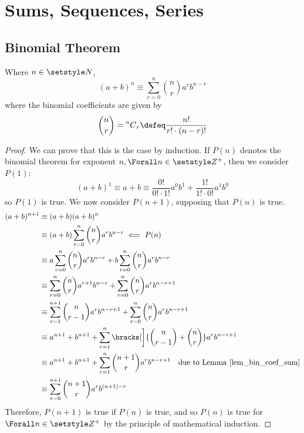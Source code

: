 \section{Sums, Sequences, Series}

\subsection{Binomial Theorem}

\begin{theorem} \label{thm_binomial_thm}
Where \(n \in \Naturals\),
\begin{equation*}
(a + b)^n \equiv \sum_{r = 0}^n \binom nr a^r b^{n - r}
\end{equation*}
where the binomial coefficients are given by
\begin{equation*}
\binom nr = \nCr nr \defeq \frac{n!}{r!\cdot(n - r)!}
\end{equation*}
\end{theorem}
\begin{proof}
We can prove that this is the case by induction. If \(P(n)\) denotes the
binomial theorem for exponent \(n, \Forall n \in \Integers^+\), then we
consider \(P(1)\):
\begin{equation*}
(a + b)^1 \equiv a + b
    \equiv \frac{0!}{0!\cdot 1!} a^0b^1 + \frac{1!}{1!\cdot 0!} a^1b^0
\end{equation*}
so \(P(1)\) is true. We now consider \(P(n + 1)\), supposing that \(P(n)\)
is true.
\begin{align*}
(a + b)^{n + 1} &\equiv (a + b)(a + b)^n \\
    &\equiv (a + b)\sum_{r = 0}^n \binom nr a^r b^{n - r}
        \impliedby P(n) \\
    &\equiv a\sum_{r = 0}^n \binom nr a^r b^{n - r}
          + b\sum_{r = 0}^n \binom nr a^r b^{n - r} \\
    &\equiv \sum_{r = 0}^n \binom nr a^{r + 1} b^{n - r}
          + \sum_{r = 0}^n \binom nr a^r b^{n - r + 1} \\
    &\equiv \sum_{r = 1}^{n + 1} \binom n{r - 1} a^r b^{n - r + 1}
          + \sum_{r = 0}^n \binom nr a^r b^{n - r + 1} \\
    &\equiv a^{n + 1} + b^{n + 1}
          + \sum_{r = 1}^n \bracks[\bigg]{\binom n{r - 1} + \binom nr}
            a^r b^{n - r + 1} \\
    &\equiv a^{n + 1} + b^{n + 1}
          + \sum_{r = 1}^n \binom{n + 1}r a^r b^{n - r + 1}
            \quad \text{due to Lemma \ref{lem_bin_coef_sum}} \\
    &\equiv \sum_{r = 0}^{n + 1} \binom{n + 1}r a^r b^{(n + 1) - r}
\end{align*}
Therefore, \(P(n + 1)\) is true if \(P(n)\) is true, and so \(P(n)\) is
true for \(\Forall n \in \Integers^+\) by the principle of mathematical
induction.
\end{proof}

